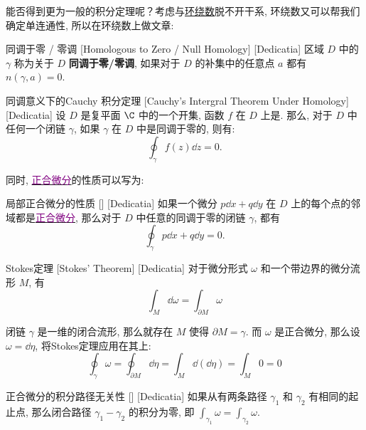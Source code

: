 \documentclass[UTF8]{ctexart}
\newcommand{\hyperrefc}[2]{\hyperref[#1]{\textcolor{purple}{#2}}}
\begin{document}
        能否得到更为一般的积分定理呢？考虑\CauchyThm 与\hyperref[dfn:WindingNumber]{环绕数}脱不开干系, 环绕数又可以帮我们确定单连通性, 所以在环绕数上做文章: 

        \begin{dfn}
            [NullHomologous]
            {同调于零 / 零调}
            [Homologous to Zero / Null Homology]
            [Dedicatia]
            区域 \(D\) 中的 \(\gamma\) 称为关于 \(D\) \textbf{同调于零/零调}, 如果对于 \(D\) 的补集中的任意点 \(a\) 都有 \(n(\gamma,a)=0\).
        \end{dfn}
        
        \begin{thm}
            [UUID]
            {同调意义下的Cauchy 积分定理}
            [Cauchy's Intergral Theorem Under Homology]
            [Dedicatia]
            设 \(D\) 是复平面 \(\C\) 中的一个开集, 函数 \(f\) 在 \(D\) 上是. 那么, 对于 \(D\) 中任何一个闭链 \(\gamma\), 如果 \(\gamma\) 在 \(D\) 中是同调于零的, 则有: 
            \[\oint_{\gamma} f(z) \dd z = 0.\]
        \end{thm}

        同时, \hyperrefc{dfn:ExactDifferential}{正合微分}的性质可以写为: 

        \begin{ppt}
            [UUID]
            {局部正合微分的性质}
            []
            [Dedicatia]
            如果一个微分 \(p\dd{x}+q\dd{y}\) 在 \(D\) 上的每个点的邻域都是\hyperrefc{dfn:ExactDifferential}{正合微分}, 那么对于 \(D\) 中任意的同调于零的闭链 \(\gamma\), 都有
            \[\oint_\gamma p\dd{x}+q\dd{y}=0.\]
        \end{ppt}

        \begin{thm}
            [UUID]
            {Stokes定理}
            [Stokes' Theorem]
            [Dedicatia]
            对于微分形式 \(\omega\) 和一个带边界的微分流形 \(M\), 有
            \[\int_{M} \dd\omega = \int_{\partial M} \omega\]
        \end{thm}

        闭链 \(\gamma\) 是一维的闭合流形, 那么就存在 \(M\) 使得 \(\partial M=\gamma\). 而 \(\omega\) 是正合微分, 那么设 \(\omega=\dd{\eta}\), 将Stokes定理应用在其上: 
        \[\oint_{\gamma} \omega = \oint_{\partial M} \dd\eta = \int_{M} \dd(\dd\eta) = \int_{M} 0 = 0\]
        
        \begin{ppt}
            [UUID]
            {正合微分的积分路径无关性}
            []
            [Dedicatia]
            如果从有两条路径  \(\gamma_1\)  和  \(\gamma_2\) 有相同的起止点, 那么闭合路径  \(\gamma_1 - \gamma_2\)  的积分为零, 即  \(\int_{\gamma_1} \omega = \int_{\gamma_2} \omega\). 
        \end{ppt}
\end{document}

